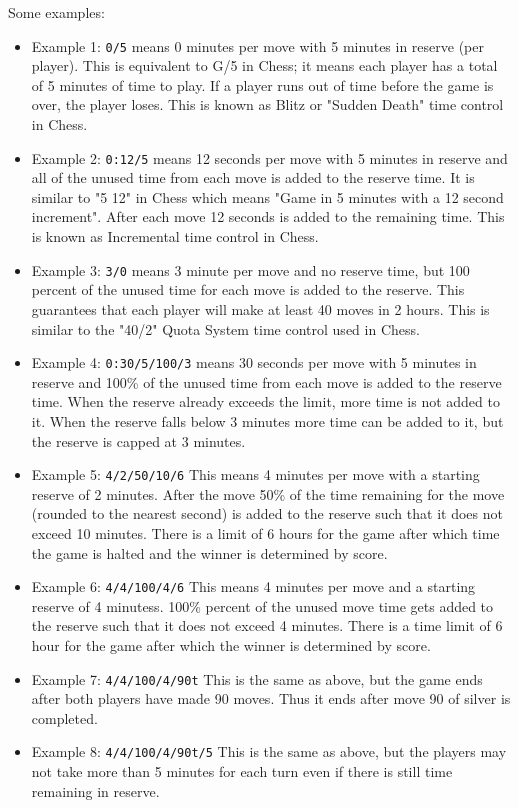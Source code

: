 \documentclass[10pt,dvipdfmx,letterpaper]{report}
\begin{document}
Some examples:
\begin{itemize}
\item Example 1: {\tt 0/5} means 0 minutes per move with 5 minutes
  in reserve (per player). This is equivalent to G/5 in Chess; it
  means each player has a total of 5 minutes of time
  to play.  If a player runs out of time before the
  game is over, the player loses.  This is known as
  Blitz or "Sudden Death" time control in Chess.

\item Example 2: {\tt 0:12/5} means 12 seconds per move
  with 5 minutes in reserve and all of the unused time from
  each move is added to the reserve time.  It is similar 
  to "5 12" in Chess which means "Game in 5 minutes with 
  a 12 second increment".  After each move 12 seconds is 
  added to the remaining time. This is known as Incremental 
  time control in Chess.

\item Example 3: {\tt 3/0} means 3 minute per
  move and no reserve time, but 100 percent of the
  unused time for each move is added to the reserve.  This
  guarantees that each player will make at least 40 moves 
  in 2 hours.  This is similar 
  to the "40/2" Quota System time control used in Chess.
  
\item Example 4: {\tt 0:30/5/100/3} means 30 seconds per move
  with 5 minutes in reserve and 100\% of the unused time from
  each move is added to the reserve time.  When the reserve 
  already exceeds the limit, more time is not added to it.  
  When the reserve falls below 3 minutes more time can be 
  added to it, but the reserve is capped at 3 minutes.
\item   Example 5: {\tt 4/2/50/10/6}
    This means 4 minutes per move with a starting reserve
    of 2 minutes.  After the move 50\% of the time remaining
    for the move (rounded to the nearest second) is added 
    to the reserve such that it does not exceed 10 minutes.  
    There is a limit of 6 hours for the game after which time 
    the game is halted and the winner is determined by score.  
\item   Example 6: {\tt 4/4/100/4/6}
    This means 4 minutes per move and a starting
    reserve of 4 minutess. 100\% percent of the unused move
    time gets added to the reserve such that it does not exceed 
    4 minutes.  There is a time limit of 6 hour for the game
    after which the winner is determined by score.
\item   Example 7: {\tt 4/4/100/4/90t}
    This is the same as above, but the game ends after both
    players have made 90 moves. Thus it ends after move 90
    of silver is completed.
\item   Example 8: {\tt 4/4/100/4/90t/5}
    This is the same as above, but the players may not take
    more than 5 minutes for each turn even if there is 
    still time remaining in reserve.
\end{itemize}
\end{document}
